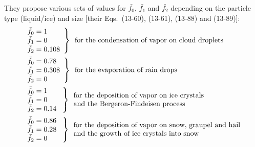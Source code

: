 They propose various sets of values for $\bar{f_0}$, $\bar{f_1}$ and $\bar{f_2}$ depending on the particle type (liquid/ice) and size [their Eqs.\ (13-60), (13-61), (13-88) and (13-89)]:
\begin{align}
 &\left.
  \begin{array}{l l}
    \bar{f_0} = 1 \\
    \bar{f_1} = 0 \\
    \bar{f_2} = 0.108
  \end{array} \right\}
  \begin{array}{l l}
    \text{for the condensation of vapor on cloud droplets}
  \end{array} \\
%
  &\left.
  \begin{array}{l l}
    \bar{f_0} = 0.78 \\
    \bar{f_1} = 0.308 \\
    \bar{f_2} = 0
  \end{array} \right\}
  \begin{array}{l l}
    \text{for the evaporation of rain drops}
  \end{array} \\
%
  &\left.
  \begin{array}{l l}
    \bar{f_0} = 1 \\
    \bar{f_1} = 0 \\
    \bar{f_2} = 0.14~
  \end{array} \right\}
  \begin{array}{l l}
    \text{for the deposition of vapor on ice crystals} \\
    \text{and the Bergeron-Findeisen process}
  \end{array} \\
%
  &\left.
  \begin{array}{l l}
    \bar{f_0} = 0.86~ \\
    \bar{f_1} = 0.28 \\
    \bar{f_2} = 0 
  \end{array} \right\}
  \begin{array}{l l}
    \text{for the deposition of vapor on snow, graupel and hail} \\
    \text{and the growth of ice crystals into snow}
  \end{array} \\
\end{align}

